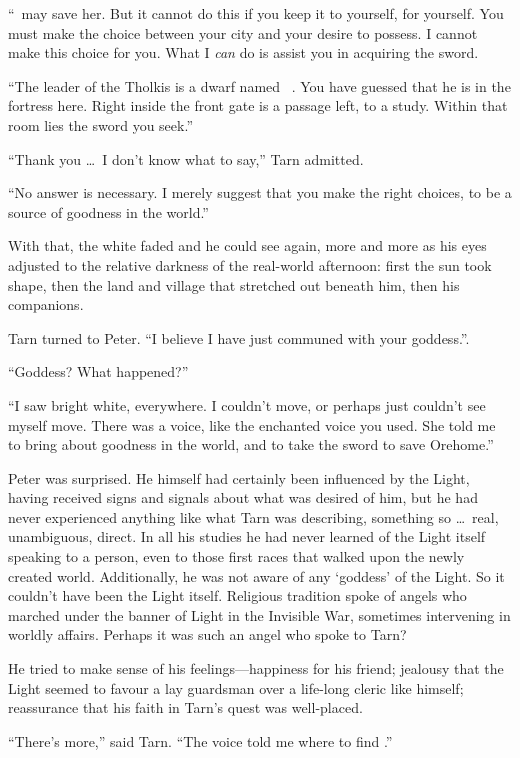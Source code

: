``\kildir\ may save her.  But it cannot do this if you keep it to yourself, for yourself.  You must make the choice between your city and your desire to possess.  I cannot make this choice for you.  What I \emph{can} do is assist you in acquiring the sword.

``The leader of the Tholkis is a dwarf named \mothzam\ \driktur. You have guessed that he is in the fortress here.  Right inside the front gate is a passage left, to a study.  Within that room lies the sword you seek.''

``Thank you \ldots\ I don't know what to say,'' Tarn admitted.

``No answer is necessary.  I merely suggest that you make the right choices, to be a source of goodness in the world.''

With that, the white faded and he could see again, more and more as his eyes adjusted to the relative darkness of the real-world afternoon: first the sun took shape, then the land and village that stretched out beneath him, then his companions.

Tarn turned to Peter. ``I believe I have just communed with your goddess.''.

``Goddess?  What happened?''

``I saw bright white, everywhere.  I couldn't move, or perhaps just couldn't see myself move. There was a voice, like the enchanted voice you used.  She told me to bring about goodness in the world, and to take the sword to save Orehome.''

Peter was surprised.  He himself had certainly been influenced by the Light, having received signs and signals about what was desired of him, but he had never experienced anything like what Tarn was describing, something so \ldots\ real, unambiguous, direct.  In all his studies he had never learned of the Light itself speaking to a person, even to those first races that walked upon the newly created world.  Additionally, he was not aware of any `goddess' of the Light.  So it couldn't have been the Light itself.  Religious tradition spoke of angels who marched under the banner of Light in the Invisible War, sometimes intervening in worldly affairs.  Perhaps it was such an angel who spoke to Tarn?

He tried to make sense of his feelings---happiness for his friend; jealousy that the Light seemed to favour a lay guardsman over a life-long cleric like himself; reassurance that his faith in Tarn's quest was well-placed.

``There's more,'' said Tarn.  ``The voice told me where to find \kildir.''


